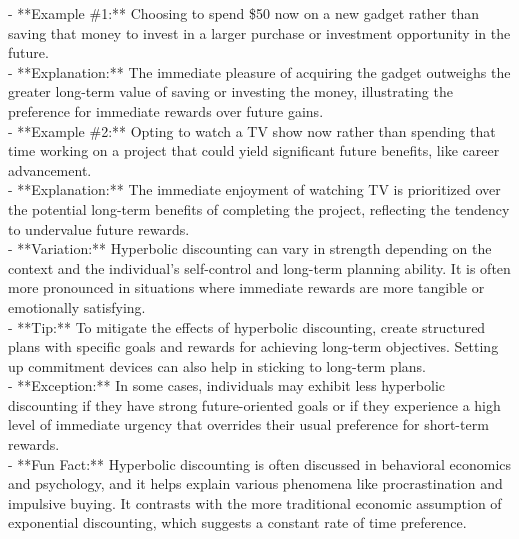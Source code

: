 \documentclass[a4paper,12pt,single,pdftex]{scrartcl}
\begin{document}
    
      - **Example \#1:** Choosing to spend \$50 now on a new gadget rather than saving that money to invest in a larger purchase or investment opportunity in the future.
    \\

    
      - **Explanation:** The immediate pleasure of acquiring the gadget outweighs the greater long-term value of saving or investing the money, illustrating the preference for immediate rewards over future gains.
    \\

    
      - **Example \#2:** Opting to watch a TV show now rather than spending that time working on a project that could yield significant future benefits, like career advancement.
    \\

    
      - **Explanation:** The immediate enjoyment of watching TV is prioritized over the potential long-term benefits of completing the project, reflecting the tendency to undervalue future rewards.
    \\

    
      - **Variation:** Hyperbolic discounting can vary in strength depending on the context and the individual’s self-control and long-term planning ability. It is often more pronounced in situations where immediate rewards are more tangible or emotionally satisfying.
    \\

    
      - **Tip:** To mitigate the effects of hyperbolic discounting, create structured plans with specific goals and rewards for achieving long-term objectives. Setting up commitment devices can also help in sticking to long-term plans.
    \\

    
      - **Exception:** In some cases, individuals may exhibit less hyperbolic discounting if they have strong future-oriented goals or if they experience a high level of immediate urgency that overrides their usual preference for short-term rewards.
    \\

    
      - **Fun Fact:** Hyperbolic discounting is often discussed in behavioral economics and psychology, and it helps explain various phenomena like procrastination and impulsive buying. It contrasts with the more traditional economic assumption of exponential discounting, which suggests a constant rate of time preference.
    \\

  
\end{document}
